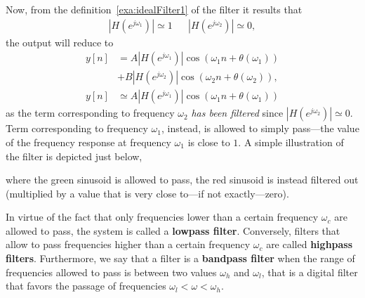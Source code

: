 \documentclass[\documentfontsize, twocolumn]{\classname}
\begin{document}
Now, from the definition~\ref{exa:idealFilter1} of the filter it results that
\begin{align*}
    \left|H(e^{j\omega_1})\right| \simeq 1 &  & \left|H(e^{j\omega_2})\right| \simeq 0,
\end{align*}
the output will reduce to
\begin{align*}
    y[n] &=
        A\left|H(e^{j\omega_1})\right|\cos{(\omega_1 n + \theta(\omega_1))} \\
        &+ B\left|H(e^{j\omega_2})\right|\cos{(\omega_2 n + \theta(\omega_2))},\\
    y[n] &\simeq
        A\left|H(e^{j\omega_1})\right|\cos{(\omega_1 n + \theta(\omega_1))}
\end{align*}
as the term corresponding to frequency $\omega_2$ \emph{has been filtered} since $\left|H(e^{j\omega_2})\right| \simeq 0$. Term corresponding to frequency $\omega_1$, instead, is allowed to simply pass---the value of the frequency response at frequency $\omega_1$ is close to $1$. A simple illustration of the filter is depicted just below,
\begin{center}
\end{center}
where the green sinusoid is allowed to pass, the red sinusoid is instead filtered out (multiplied by a value that is very close to---if not exactly---zero).

In virtue of the fact that only frequencies lower than a certain frequency $\omega_c$ are allowed to pass, the system is called a \textbf{lowpass filter}. Conversely, filters that allow to pass frequencies higher than a certain frequency $\omega_c$ are called \textbf{highpass filters}. Furthermore, we say that a filter is a \textbf{bandpass filter} when the range of frequencies allowed to pass is between two values $\omega_h$ and $\omega_l$, that is a digital filter that favors the passage of frequencies $\omega_l < \omega < \omega_h$.
\end{document}
